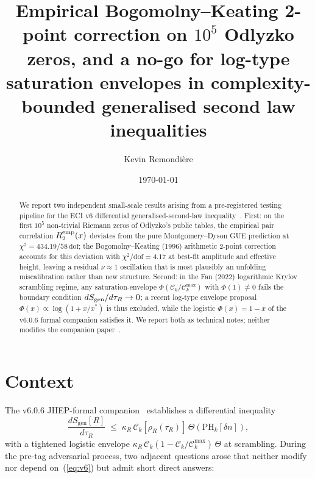 \documentclass[aps,prd,superscriptaddress,nofootinbib,floatfix,10pt]{revtex4-2}
\newcommand{\Ck}{\mathcal{C}_{k}}
\newcommand{\tauR}{\tau_{R}}
\newcommand{\kR}{\kappa_{R}}
\newcommand{\Sgen}{S_{\mathrm{gen}}}
\begin{document}
\title{Empirical Bogomolny--Keating 2-point correction on $10^{5}$
Odlyzko zeros, and a no-go for log-type saturation envelopes in
complexity-bounded generalised second law inequalities}

\author{Kevin Remondi\`ere}

\date{\today}

\begin{abstract}
We report two independent small-scale results arising from a
pre-registered testing pipeline for the ECI v6 differential
generalised-second-law inequality~\cite{Remondiere2026ECIv6}.
First: on the first $10^{5}$ non-trivial Riemann zeros of Odlyzko's
public tables, the empirical pair correlation $R_{2}^{\rm emp}(x)$
deviates from the pure Montgomery--Dyson GUE prediction at
$\chi^{2} = 434.19/58\,\mathrm{dof}$; the Bogomolny--Keating (1996)
arithmetic 2-point correction accounts for this deviation with
$\chi^{2}/\mathrm{dof} = 4.17$ at best-fit amplitude and effective
height, leaving a residual $\nu\approx 1$ oscillation that is
most plausibly an unfolding miscalibration rather than new structure.
Second: in the Fan (2022) logarithmic Krylov scrambling regime, any
saturation-envelope $\Phi(\mathcal{C}_k/\mathcal{C}_k^{\max})$ with
$\Phi(1) \neq 0$ fails the boundary condition
$dS_{\rm gen}/d\tauR \to 0$; a recent log-type envelope proposal
$\Phi(x) \propto \log(1+x/x^{\ast})$ is thus excluded, while the
logistic $\Phi(x) = 1 - x$ of the v6.0.6 formal companion satisfies it.
We report both as technical notes; neither modifies the companion
paper~\cite{Remondiere2026ECIv6}.
\end{abstract}

\maketitle

\section{Context}

The v6.0.6 JHEP-formal companion~\cite{Remondiere2026ECIv6} establishes
a differential inequality
\begin{equation}
 \frac{d\Sgen[R]}{d\tauR} \;\le\; \kR\,\Ck[\rho_{R}(\tauR)]\,
 \Theta(\mathrm{PH}_{k}[\delta n]),
 \label{eq:v6}
\end{equation}
with a tightened logistic envelope
$\kR\,\Ck(1-\Ck/\Ck^{\max})\,\Theta$ at scrambling. During the
pre-tag adversarial process, two adjacent questions arose that neither
modify nor depend on~(\ref{eq:v6}) but admit short direct answers:
\end{document}
